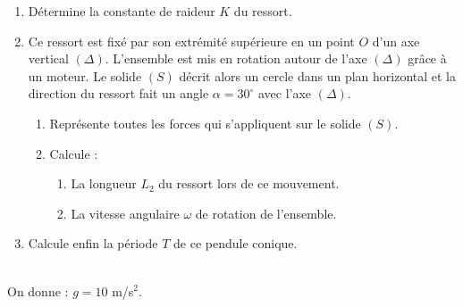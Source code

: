 \documentclass[11pt]{article}
\begin{document}
\begin{minipage}{0.6\linewidth}
\begin{enumerate}
  \item Détermine la constante de raideur $K$ du ressort.
  \item Ce ressort est fixé par son extrémité supérieure en un point $O$ d'un axe vertical $(\Delta)$. L'ensemble est mis en rotation autour de l'axe $(\Delta)$ grâce à un moteur. Le solide $(S)$ décrit alors un cercle dans un plan horizontal et la direction du ressort fait un angle $\alpha = 30^\circ$ avec l'axe $(\Delta)$.
  \begin{enumerate}[label=\alph*.]
    \item Représente toutes les forces qui s'appliquent sur le solide $(S)$.
    \item Calcule :
    \begin{enumerate}[label=b.\arabic*.]
      \item La longueur $L_2$ du ressort lors de ce mouvement.
      \item La vitesse angulaire $\omega$ de rotation de l'ensemble.
    \end{enumerate}
  \end{enumerate}
  \item Calcule enfin la période $T$ de ce pendule conique.
\end{enumerate}
\end{minipage}\hfill
\begin{minipage}{0.36\linewidth}
\centering
{}
\end{minipage}
\noindent\\[2pt] On donne : $g = 10$ m/s$^2$.
\end{document}
